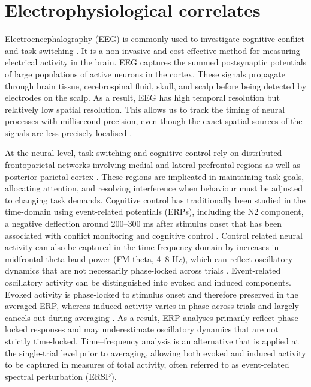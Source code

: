 \documentclass[12pt,a4paper]{report}
\begin{document}
\section{Electrophysiological correlates}

Electroencephalography (EEG) is commonly used to investigate cognitive conflict and task switching \parencite{luck2014erp, cohen2013thetaconflict, cavanagh2015metatheta, cavanagh2014theta, depestele2023thetadriving}. It is a non-invasive and cost-effective method for measuring electrical activity in the brain. EEG captures the summed postsynaptic potentials of large populations of active neurons in the cortex. These signals propagate through brain tissue, cerebrospinal fluid, skull, and scalp before being detected by electrodes on the scalp. As a result, EEG has high temporal resolution but relatively low spatial resolution. This allows us to track the timing of neural processes with millisecond precision, even though the exact spatial sources of the signals are less precisely localised \parencite[Chapter 3]{gazzaniga2025principles}. 

At the neural level, task switching and cognitive control rely on distributed frontoparietal networks involving medial and lateral prefrontal regions as well as posterior parietal cortex \parencite{kiesel2010review}. These regions are implicated in maintaining task goals, allocating attention, and resolving interference when behaviour must be adjusted to changing task demands. Cognitive control has traditionally been studied in the time-domain using event-related potentials (ERPs), including the N2 component, a negative deflection around 200--300 ms after stimulus onset that has been associated with conflict monitoring and cognitive control \parencite{folstein2008n2,luck2014erp}. Control related neural activity can also be captured in the time-frequency domain by increases in midfrontal theta-band power (FM-theta, 4–8 Hz), which can reflect oscillatory dynamics that are not necessarily phase-locked across trials \parencite{cavanagh2014theta,cavanagh2015metatheta,cohen2013thetaconflict}. Event-related oscillatory activity can be distinguished into evoked and induced components. Evoked activity is phase-locked to stimulus onset and therefore preserved in the averaged ERP, whereas induced activity varies in phase across trials and largely cancels out during averaging \parencite{herrmann2014timefrequencytutorial,herrmann2005waveletanalysis}. As a result, ERP analyses primarily reflect phase-locked responses and may underestimate oscillatory dynamics that are not strictly time-locked. Time–frequency analysis is an alternative that is applied at the single-trial level prior to averaging, allowing both evoked and induced activity to be captured in measures of total activity, often referred to as event-related spectral perturbation (ERSP).
\end{document}
